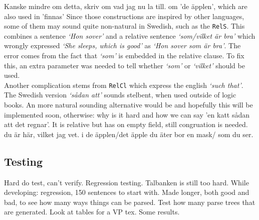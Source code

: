 \documentclass{report}
\begin{document}
Kanske mindre om detta, skriv om vad jag nu la till.
om 'de äpplen', which are also used in 'finnas'
Since those constructions are inspired by other languages, some of them may sound quite
non-natural in Swedish, such as the \verb|RelS|. This combines a sentence \emph{`Hon sover'}
and a relative sentence \emph{`som/vilket är bra'} which wrongly expressed 
\emph{`She sleeps, which is good'} as
\emph{`Hon sover som är bra'}. The error comes from the fact that \emph{`som'} is
embedded in the relative clause. To fix this, an extra parameter was needed to tell whether
\emph{`som'} or \emph{`vilket'} should be used. \\
Another complication stems from \verb|RelCl| which express the english \emph{`such that'}.
The Swedish version \emph{`sådan att'} sounds stelbent, when used outside of logic books.
An more natural sounding alternative would be
and hopefully this will be implemented soon, otherwise: why is it hard and how we can say
'en katt sådan att det regnar'. It is relative but has on empty field, still congruation is
needed.
du är här, vilket jag vet.
i de äpplen/det äpple du äter bor en mask/ som du ser.\\


\subsection{Testing}
Hard do test, can't verify. Regression testing. Talbanken is still too hard.
While developing: regression, 150 sentences to start with. Made longer, both good and bad,
to see how many ways things can be parsed.
Test how many parse trees that are generated.
Look at tables for a VP tex.
Some results.

\end{document}

